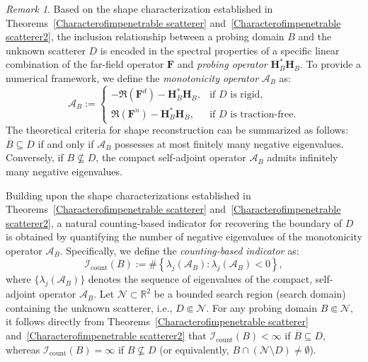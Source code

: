 \documentclass[11pt,reqno,twoside]{amsart}
\theoremstyle{definition}
\theoremstyle{remark}
\newtheorem{rem}{Remark}[section]
\numberwithin{equation}{section}
\begin{document}
\begin{rem}\label{rem:41}
Based on the shape characterization established in Theorems~\ref{Characterofimpenetrable scatterer} and~\ref{Characterofimpenetrable scatterer2}, the inclusion relationship between a probing domain $B$ and the unknown scatterer $D$ is encoded in the spectral properties of a specific linear combination of the far-field operator \(\mathbf F\) and \emph{probing operator} \(\mathbf{H}_B^* \mathbf{H}_B\). To provide a numerical framework, we define the \emph{monotonicity operator} $\mathcal{A}_{B}$ as:
\begin{equation}\label{operator:A_B}
\mathcal{A}_{B} :=
\begin{cases}
-\Re(\mathbf{F}^d) - \mathbf{H}_B^* \mathbf{H}_B, & 	\text{if $D$ is rigid}, \\
\Re(\mathbf{F}^n) - \mathbf{H}_B^* \mathbf{H}_B, & 	\text{if $D$ is traction-free}.
\end{cases}
\end{equation}
The theoretical criteria for shape reconstruction can be summarized as follows: $\overline B \subseteq D$ if and only if $\mathcal{A}_{B}$ possesses at most finitely many negative eigenvalues. Conversely, if $B \not\subseteq D$, the compact self-adjoint operator $\mathcal{A}_{B}$ admits infinitely many negative eigenvalues.


Building upon the shape characterizations established in Theorems~\ref{Characterofimpenetrable scatterer} and~\ref{Characterofimpenetrable scatterer2}, a natural counting-based indicator for recovering the boundary of $D$ is obtained by quantifying the number of negative eigenvalues of the monotonicity operator $\mathcal{A}_{B}$. Specifically, we define the \emph{counting-based indicator} as:
\begin{equation}\label{eq:indicatorContinuous}
    \mathcal{I}_{\mathrm{count}}(B) := \# \left\{ \lambda_j(\mathcal{A}_{B}) : \lambda_j(\mathcal{A}_{B}) < 0 \right\},
\end{equation}
where $\{\lambda_j(\mathcal{A}_{B})\}$ denotes the sequence of eigenvalues of the compact, self-adjoint operator $\mathcal{A}_{B}$. Let $\mathcal{N} \subset \mathbb{R}^2$ be a bounded search region (search domain) containing the unknown scatterer, i.e., $D \Subset \mathcal{N}$. For any probing domain $B \Subset \mathcal{N}$, it follows directly from Theorems~\ref{Characterofimpenetrable scatterer} and~\ref{Characterofimpenetrable scatterer2} that $\mathcal{I}_{\mathrm{count}}(B) < \infty$ if $\overline{B} \subseteq D$, whereas $\mathcal{I}_{\mathrm{count}}(B) = \infty$ if $B \not\subseteq D$ (or equivalently, $B \cap (\mathcal{N} \setminus D) \neq \emptyset$). 


\end{rem}
\end{document}
